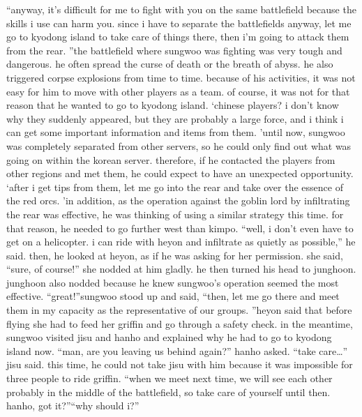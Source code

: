 “anyway, it’s difficult for me to fight with you on the same battlefield because the skills i use can harm you.
 since i have to separate the battlefields anyway, let me go to kyodong island to take care of things there, then i’m going to attack them from the rear.
”the battlefield where sungwoo was fighting was very tough and dangerous.
 he often spread the curse of death or the breath of abyss.
 he also triggered corpse explosions from time to time.
 because of his activities, it was not easy for him to move with other players as a team.
of course, it was not for that reason that he wanted to go to kyodong island.
‘chinese players? i don’t know why they suddenly appeared, but they are probably a large force, and i think i can get some important information and items from them.
’until now, sungwoo was completely separated from other servers, so he could only find out what was going on within the korean server.
therefore, if he contacted the players from other regions and met them, he could expect to have an unexpected opportunity.
‘after i get tips from them, let me go into the rear and take over the essence of the red orcs.
’in addition, as the operation against the goblin lord by infiltrating the rear was effective, he was thinking of using a similar strategy this time.
 for that reason, he needed to go further west than kimpo.
“well, i don’t even have to get on a helicopter.
 i can ride with heyon and infiltrate as quietly as possible,” he said.
then, he looked at heyon, as if he was asking for her permission.
she said, “sure, of course!” she nodded at him gladly.
he then turned his head to junghoon.
junghoon also nodded because he knew sungwoo’s operation seemed the most effective.
“great!”sungwoo stood up and said, “then, let me go there and meet them in my capacity as the representative of our groups.
”heyon said that before flying she had to feed her griffin and go through a safety check.
in the meantime, sungwoo visited jisu and hanho and explained why he had to go to kyodong island now.
“man, are you leaving us behind again?” hanho asked.
“take care…” jisu said.
this time, he could not take jisu with him because it was impossible for three people to ride griffin.
“when we meet next time, we will see each other probably in the middle of the battlefield, so take care of yourself until then.
 hanho, got it?”“why should i?”

